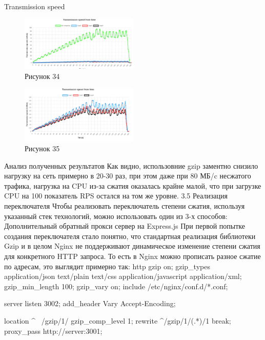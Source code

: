 \documentclass[12pt]{article}
\begin{document}
    Transmission speed
    \begin{figure}[h!]
        \centering
        \includegraphics[width=0.5\textwidth]{../images/second_part/Transmission_speed.png}
        \caption{Рисунок 34}
    \end{figure}

    \begin{figure}[h!]
        \centering
        \includegraphics[width=0.5\textwidth]{../images/second_part/Transmission_speed_withot_nocompress.png}
        \caption{Рисунок 35}
    \end{figure}

    Анализ полученных результатов
    Как видно, использовние gzip заментно снизило нагрузку на сеть примерно в 20-30 раз,
    при этом даже при 80 МБ/c несжатого трафика, нагрузка на CPU из-за сжатия оказалась крайне малой, что при загрузке CPU на 100%
    показатель RPS остался на том же уровне.
    3.5 Реализация переключателя
    Чтобы реализовать переключатель степени сжатия, используя указанный стек технологий, можно использовать один из 3-х способов:
    Дополнительный обратный прокси сервер на Express.js
    При первой попытке создания переключателя стало понятно, что стандартная реализация библиотеки Gzip и в целом Nginx не поддерживают динамическое изменение степени сжатия для конкретного HTTP запроса. То есть в Nginx можно прописать разное сжатие по адресам, это выглядит примерно так:
    http
    gzip on;
    gzip_types application/json text/plain text/css application/javascript application/xml;
    gzip_min_length 100;
    gzip_vary on;
    include /etc/nginx/conf.d/*.conf;

    server
    listen 3002;
    add_header Vary Accept-Encoding;

    location ^~ /gzip/1/ {
    gzip_comp_level 1;
    rewrite ^/gzip/1/(.*)$ /$1 break;
    proxy_pass http://server:3001;
    }
\end{document}
